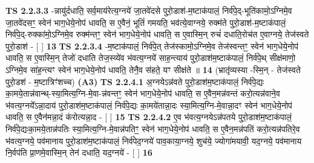 \documentclass[17pt]{extarticle}
\begin{document}
                  \newline
                                \textbf{ TS 2.2.3.3} \newline
                  -न्नायु॑र्दधाति॒ सर्व॒माय॑रेत्य॒ग्नये॑ जा॒तवे॑दसे पुरो॒डाश॑-म॒ष्टाक॑पालं॒ निर्व॑पे॒द्-भूति॑कामो॒ऽग्निमे॒व जा॒तवे॑दसꣳ॒॒ स्वेन॑ भाग॒धेये॒नोप॑ धावति॒ स ए॒वैनं॒ भूतिं॑ गमयति॒ भव॑त्ये॒वाग्नये॒ रुक्म॑ते पुरो॒डाश॑-म॒ष्टाक॑पालं॒ निर्व॑पे॒द्-रुक्का॑मो॒ऽग्निमे॒व रुक्म॑न्तꣳ॒॒ स्वेन॑ भाग॒धेये॒नोप॑ धावति॒ स ए॒वास्मि॒न् रुचं॑ दधाति॒रोच॑त ए॒वाग्नये॒ तेज॑स्वते पुरो॒डाश॑ - [  ] \textbf{  13} \newline
                  \newline
                                \textbf{ TS 2.2.3.4} \newline
                  -म॒ष्टाक॑पालं॒ निर्व॑पे॒त् तेज॑स्कामो॒ऽग्निमे॒व तेज॑स्वन्तꣳ॒॒ स्वेन॑ भाग॒धेये॒नोप॑ धावति॒ स ए॒वास्मि॒न् तेजो॑ दधाति तेज॒स्व्ये॑व भ॑वत्य॒ग्नये॑ साह॒न्त्याय॑ पुरो॒डाश॑म॒ष्टाक॑पालं॒ निर्व॑पे॒थ् सीक्ष॑माणो॒ ऽग्निमे॒व सा॑ह॒न्त्यꣳ स्वेन॑ भाग॒धेये॒नोप॑ धावति॒ तेनै॒व स॑हते॒ यꣳ सीक्ष॑ते ॥ \textbf{  14 } \newline
                  \newline
                      (भ्रातृ॑व्यस्या -स्मि॒न् - तेज॑स्वते पुरो॒डश॑ - म॒ष्टात्रिꣳ॑शच्च)  \textbf{(A3)} \newline \newline
                                        \textbf{ TS 2.2.4.1} \newline
                  अ॒ग्नयेऽन्न॑वते पुरो॒डाश॑म॒ष्टाक॑पालं॒ निर्व॑पे॒द्यः का॒मये॒तान्न॑वान्थ्-स्या॒मित्य॒ग्नि-मे॒वा-न्न॑वन्तꣳ॒॒ स्वेन॑ भाग॒धेये॒नोप॑ धावति॒ स ए॒वैन॒मन्न॑वन्तं करो॒त्यन्न॑वाने॒व भ॑वत्य॒ग्नये᳚ऽन्ना॒दाय॑ पुरो॒डाश॑म॒ष्टाक॑पालं॒ निर्व॑पे॒द्यः का॒मये॑तान्ना॒दः स्या॒मित्य॒ग्नि-मे॒वान्ना॒दꣳ स्वेन॑ भाग॒धेये॒नोप॑ धावति॒ स ए॒वैन॑मन्ना॒दं क॑रोत्यन्ना॒द - [  ] \textbf{  15} \newline
                  \newline
                                \textbf{ TS 2.2.4.2} \newline
                  ए॒व भ॑वत्य॒ग्नयेऽन्न॑पतये पुरो॒डाश॑म॒ष्टाक॑पालं॒ निर्व॑पे॒द्यःका॒मये॒तान्न॑पतिः स्या॒मित्य॒ग्नि-मे॒वान्न॑पतिꣳ॒॒ स्वेन॑ भाग॒धेये॒नोप॑ धावति॒ स ए॒वैन॒मन्न॑पतिं करो॒त्यन्न॑पतिरे॒व भ॑वत्य॒ग्नये॒ पव॑मानाय पुरो॒डाश॑म॒ष्टाक॑पालं॒ निर्व॑पेद॒ग्नये॑ पाव॒काया॒ग्नये॒ शुच॑ये॒ ज्योगा॑मयावी॒ यद॒ग्नये॒ पव॑मानाय नि॒र्वप॑ति प्रा॒णमे॒वास्मि॒न् तेन॑ दधाति॒ यद॒ग्नये॑ - [  ] \textbf{  16} \newline
                  \newline
\end{document}
